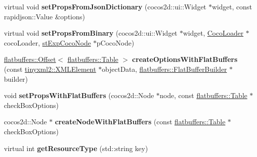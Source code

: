 \begin{DoxyCompactItemize}
\item 
\mbox{\label{classcocostudio_1_1CheckBoxReader_a57dbaccdbbe96ea3668ea1b6dd67299b}} 
virtual void {\bfseries set\+Props\+From\+Json\+Dictionary} (cocos2d\+::ui\+::\+Widget $\ast$widget, const rapidjson\+::\+Value \&options)
\item 
\mbox{\label{classcocostudio_1_1CheckBoxReader_a917ef9ac22f96b6e224888e8f3fb345a}} 
virtual void {\bfseries set\+Props\+From\+Binary} (cocos2d\+::ui\+::\+Widget $\ast$widget, \hyperlink{classcocostudio_1_1CocoLoader}{Coco\+Loader} $\ast$coco\+Loader, \hyperlink{structcocostudio_1_1stExpCocoNode}{st\+Exp\+Coco\+Node} $\ast$p\+Coco\+Node)
\item 
\mbox{\label{classcocostudio_1_1CheckBoxReader_a82c77725d443d71f8c4bcda54a927e7e}} 
\hyperlink{structflatbuffers_1_1Offset}{flatbuffers\+::\+Offset}$<$ \hyperlink{classflatbuffers_1_1Table}{flatbuffers\+::\+Table} $>$ {\bfseries create\+Options\+With\+Flat\+Buffers} (const \hyperlink{classtinyxml2_1_1XMLElement}{tinyxml2\+::\+X\+M\+L\+Element} $\ast$object\+Data, \hyperlink{classflatbuffers_1_1FlatBufferBuilder}{flatbuffers\+::\+Flat\+Buffer\+Builder} $\ast$builder)
\item 
\mbox{\label{classcocostudio_1_1CheckBoxReader_a1c752818b327639a92eac6df9a852405}} 
void {\bfseries set\+Props\+With\+Flat\+Buffers} (cocos2d\+::\+Node $\ast$node, const \hyperlink{classflatbuffers_1_1Table}{flatbuffers\+::\+Table} $\ast$check\+Box\+Options)
\item 
\mbox{\label{classcocostudio_1_1CheckBoxReader_a2187d5b5405b8fbbd7d5d21d5583f9e9}} 
cocos2d\+::\+Node $\ast$ {\bfseries create\+Node\+With\+Flat\+Buffers} (const \hyperlink{classflatbuffers_1_1Table}{flatbuffers\+::\+Table} $\ast$check\+Box\+Options)
\item 
\mbox{\label{classcocostudio_1_1CheckBoxReader_a107338dc5de7105aa052ea12d06ca6b9}} 
virtual int {\bfseries get\+Resource\+Type} (std\+::string key)
\end{DoxyCompactItemize}
